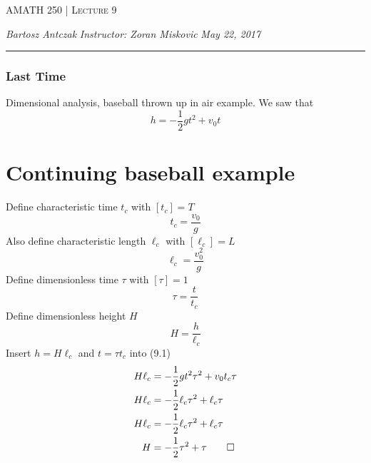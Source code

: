\documentclass{report}
\newcommand{\lectureNum}{9}
\newcommand{\curDate}{May 22, 2017}
\newcommand{\course}{AMATH 250}
\newcommand{\instructor}{Zoran Miskovic}
\begin{document}
\begin{center}
\begin{Large}
\textsc{\course{} | Lecture \lectureNum{}}
\end{Large}
\end{center} 
\noindent \textit{Bartosz Antczak} \hfill
\textit{Instructor: \instructor{}} \hfill
\textit{\curDate{}}
\rule{\textwidth}{0.4pt}
\subsubsection{Last Time}
Dimensional analysis, baseball thrown up in air example. We saw that
\begin{equation}
h = -\frac{1}{2}gt^2 + v_0t
\end{equation}
\section{Continuing baseball example}
Define characteristic time $t_c$ with $[t_c] = T$
$$t_c = \frac{v_0}{g}$$
Also define characteristic length $\ell_c$ with $[\ell_c] = L$
$$\ell_c = \frac{v_0^2}{g}$$
Define dimensionless time $\tau$ with $[\tau] = 1$
$$\tau = \frac{t}{t_c}$$
Define dimensionless height $H$
$$H = \frac{h}{\ell_c}$$
Insert $h = H\ell_c$ and $t = \tau t_c$ into (9.1)
\begin{align}
H\ell_c &= -\frac{1}{2}gt^2\tau^2 + v_0t_c\tau \\
H\ell_c &= -\frac{1}{2}\ell_c\tau^2 + \ell_c\tau \\
H\ell_c &= -\frac{1}{2}\ell_c\tau^2 + \ell_c\tau \\
H &= -\frac{1}{2}\tau^2 + \tau \qed
\end{align}
\end{document}
